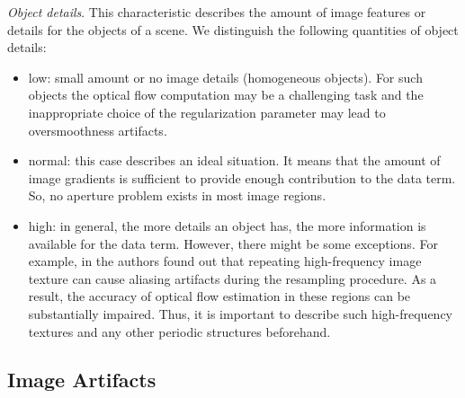 \noindent \textit{Object details}. This characteristic describes the amount of image features or details  for the objects of a scene. We distinguish the following quantities of object details:  
\begin{itemize}
	\item low: small amount or no image details (homogeneous objects). For such objects the optical flow computation may be a challenging task and the inappropriate choice of the regularization parameter may lead to oversmoothness artifacts. 
	
	\item normal: this case describes an ideal situation. It means that the amount of image gradients is sufficient to provide enough contribution to the data term. So, no aperture problem exists in most image regions.
	
	\item high: in general, the more details an object has, the more information is available for the data term. However, there might be some exceptions. For example, in \cite{HarmonyFlow} the authors found out that repeating high-frequency image texture can cause aliasing artifacts during the resampling procedure. As a result, the accuracy of optical flow estimation in these regions can be substantially impaired.  Thus, it is important to describe such high-frequency textures and any other periodic structures beforehand.
\end{itemize}


\subsection{Image Artifacts}
\label{image_artifacts}

